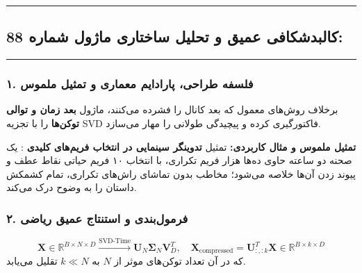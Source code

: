 \clearpage
{}
\vspace*{0.2cm}
\noindent\rule{\textwidth}{1.2pt}
\vspace*{0.1cm}
\subsection{کالبدشکافی عمیق و تحلیل ساختاری ماژول شماره 88: }
\label{sec:mod_svd_sequence_attention}
\vspace*{-0.2cm}
\noindent\rule{\textwidth}{0.5pt}
\vspace*{0.3cm}

\subsubsection*{۱. فلسفه طراحی، پارادایم معماری و تمثیل ملموس}
برخلاف روش‌های معمول که بعد کانال را فشرده می‌کنند، ماژول  \textbf{بعد زمان و توالی توکن‌ها} را با تجزیه SVD فاکتورگیری کرده و پیچیدگی طولانی را مهار می‌سازد.

\textbf{تمثیل ملموس و مثال کاربردی:}
تمثیل \textbf{تدوینگر سینمایی در انتخاب فریم‌های کلیدی }: یک صحنه دو ساعته حاوی ده‌ها هزار فریم تکراری، با انتخاب ۱۰ فریم حیاتی نقاط عطف و پیوند زدن آن‌ها خلاصه می‌شود؛ مخاطب بدون تماشای راش‌های تکراری، تمام کشمکش داستان را به وضوح درک می‌کند.

\subsubsection*{۲. فرمول‌بندی و استنتاج عمیق ریاضی }
\begin{equation}
\mathbf{X} \in \mathbb{R}^{B \times N \times D} \xrightarrow{\text{SVD-Time}} \mathbf{U}_N \mathbf{\Sigma}_N \mathbf{V}_D^T, \quad \mathbf{X}_{\text{compressed}} = \mathbf{U}_{:,:k}^T \mathbf{X} \in \mathbb{R}^{B \times k \times D}
\end{equation}
که در آن تعداد توکن‌های موثر از $N$ به $k \ll N$ تقلیل می‌یابد.

